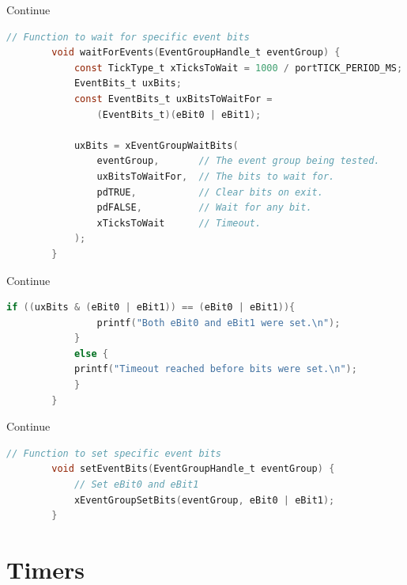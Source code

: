 \documentclass[10pt]{beamer}
\begin{document}
\begin{frame}[fragile]{Continue}
    
    \begin{lstlisting}[language=C, caption=Recieve]
        // Function to wait for specific event bits
        void waitForEvents(EventGroupHandle_t eventGroup) {
            const TickType_t xTicksToWait = 1000 / portTICK_PERIOD_MS;
            EventBits_t uxBits;
            const EventBits_t uxBitsToWaitFor = 
                (EventBits_t)(eBit0 | eBit1);
        
            uxBits = xEventGroupWaitBits(
                eventGroup,       // The event group being tested.
                uxBitsToWaitFor,  // The bits to wait for.
                pdTRUE,           // Clear bits on exit.
                pdFALSE,          // Wait for any bit.
                xTicksToWait      // Timeout.
            );
        }
    \end{lstlisting}
\end{frame}


\begin{frame}[fragile]{Continue}
    
    \begin{lstlisting}[language=C, caption=Recieve]
            if ((uxBits & (eBit0 | eBit1)) == (eBit0 | eBit1)){
                printf("Both eBit0 and eBit1 were set.\n");
            } 
            else {
            printf("Timeout reached before bits were set.\n");
            }
        }
    \end{lstlisting}
\end{frame}



\begin{frame}[fragile]{Continue}
    
    \begin{lstlisting}[language=C, caption=Sent]
        // Function to set specific event bits
        void setEventBits(EventGroupHandle_t eventGroup) {
            // Set eBit0 and eBit1
            xEventGroupSetBits(eventGroup, eBit0 | eBit1);
        }        
    \end{lstlisting}
\end{frame}


\section{Timers}
\end{document}
